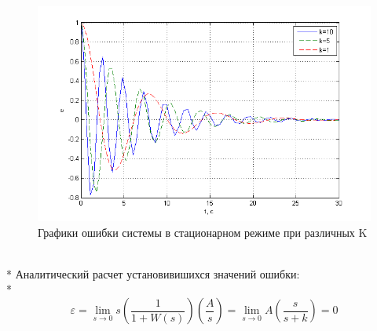 \documentclass[a4paper, 12pt]{article}
\begin{document}
\begin{figure}[h!]
	\centering
	\includegraphics[width = 1\textwidth]{hinh6}
	\caption{Графики ошибки системы в стационарном режиме при различных K}
\end{figure}
\hfill\\*
\newpage
Аналитический расчет установивишихся значений ошибки:\\*
\begin{equation}
\varepsilon=\lim_{s \to 0} s(\frac{1}{1+W(s)})(\frac{A}{s})=\lim_{s \to 0} A(\frac{s}{s+k})=0
\end{equation}
\end{document}
